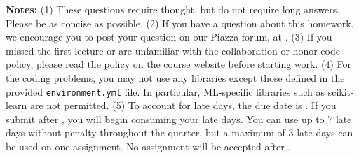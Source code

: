{\bf Notes:} (1) These questions require thought, but do not require long
answers. Please be as concise as possible.  (2) If you have a question
about this homework, we encourage you to post your question on our
Piazza forum, at \piazza. (3) If you
missed the first lecture or are unfamiliar with the collaboration or honor
code policy, please read the policy on the course website before starting work.
(4) For the coding problems, you may not
use any libraries except those defined in the provided \texttt{environment.yml}
file. In particular, ML-specific libraries such as scikit-learn are not
permitted. (5) To account for late days, the due date is \due. If you submit after
\due, you will begin consuming your
late days. 
You can use up to 7 late days without penalty throughout the quarter, 
but a maximum of 3 late days can be used on one assignment. 
No assignment will be accepted after \latedue. 